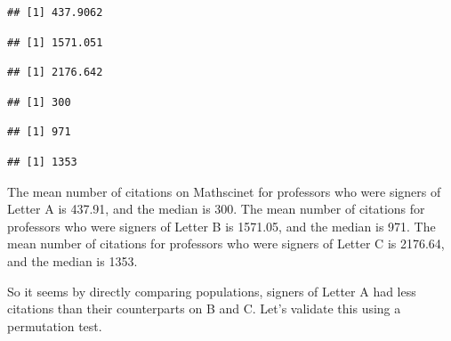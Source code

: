 \documentclass[]{article}
\begin{document}
\begin{verbatim}
## [1] 437.9062
\end{verbatim}

\begin{verbatim}
## [1] 1571.051
\end{verbatim}

\begin{verbatim}
## [1] 2176.642
\end{verbatim}

\begin{verbatim}
## [1] 300
\end{verbatim}

\begin{verbatim}
## [1] 971
\end{verbatim}

\begin{verbatim}
## [1] 1353
\end{verbatim}

The mean number of citations on Mathscinet for professors who were
signers of Letter A is 437.91, and the median is 300. The mean number of
citations for professors who were signers of Letter B is 1571.05, and
the median is 971. The mean number of citations for professors who were
signers of Letter C is 2176.64, and the median is 1353.

So it seems by directly comparing populations, signers of Letter A had
less citations than their counterparts on B and C. Let's validate this
using a permutation test.
\end{document}
